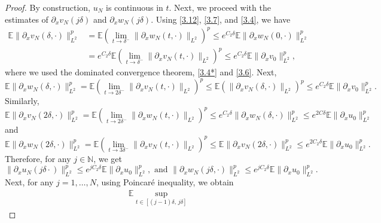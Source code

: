 \documentclass[a4paper,12pt]{article}
\numberwithin{equation}{section}
\begin{document}
\begin{proof}  By construction, $u_N$ is continuous in $t$.
Next, we proceed with the estimates of $\partial_x v_N(j \delta)$ and
$\partial_x w_N(j \delta)$.
Using \eqref{3.12}, \eqref{3.7}, and \eqref{3.4}, we have
\begin{align*}
\mathbb{E} \|\partial_x v_N(\delta, \cdot)\|_{L^2}^p
&= \mathbb{E} \left( \lim_{t \to \delta^-}
      \|\partial_x w_N(t, \cdot)\|_{L^2} \right)^p
\le e^{C_2 \delta} \mathbb{E} \|\partial_x w_N(0, \cdot)\|_{L^2}^p \nonumber \\
&= e^{C_2 \delta} \mathbb{E}
   \left( \lim_{t \to \delta^-}
   \|\partial_x v_N(t, \cdot)\|_{L^2} \right)^p
\le e^{C_2 \delta} \mathbb{E} \|\partial_x v_0\|_{L^2}^p,
\end{align*}
where we used the dominated convergence theorem, \eqref{3.4*} and \eqref{3.6}. Next,
\begin{equation*}
\mathbb{E} \|\partial_x w_N(\delta, \cdot)\|_{L^2}^p
= \mathbb{E} \left( \lim_{t \to 2 \delta^-}
\|\partial_x v_N(t, \cdot)\|_{L^2} \right)^p \le \mathbb{E} \left(
\|\partial_x v_N(\delta, \cdot)\|_{L^2} \right)^p
\le e^{C_2 \delta} \mathbb{E} \|\partial_x v_0\|_{L^2}^p .
\end{equation*}
Similarly,
\begin{equation*}
\mathbb{E} \|\partial_x v_N(2\delta, \cdot)\|_{L^2}^p
 = \mathbb{E} \left( \lim_{t \to 2\delta^-}
\|\partial_x w_N(t, \cdot)\|_{L^2} \right)^p \le e^{C_2\delta}\|\partial_x w_N(\delta, \cdot)\|_{L^2}^p
\le e^{2C\delta} \mathbb{E} \|\partial_x u_0\|_{L^2}^p
\end{equation*}
and
\begin{equation*}
\mathbb{E} \|\partial_x w_N(2\delta, \cdot)\|_{L^2}^p
= \mathbb{E} \left( \lim_{t \to 3\delta^-}
\|\partial_x v_N(t, \cdot)\|_{L^2} \right)^p \le \mathbb{E} 
\|\partial_x v_N(2 \delta, \cdot)\|_{L^2}^p
\le e^{2C_2\delta} \mathbb{E} \|\partial_x u_0\|_{L^2}^p .
\end{equation*}
Therefore, for any $j \in \mathbb{N}$, we get
\begin{equation} \label{3.14}
\|\partial_x u_N(j\delta \cdot)\|_{L^2}^p
\le e^{j C_2 \delta} \mathbb{E} \|\partial_x u_0\|_{L^2}^p,
 {\text{ and }}
\|\partial_x w_N(j\delta, \cdot)\|_{L^2}^p
\le e^{j C_2 \delta} \mathbb{E} \|\partial_x u_0\|_{L^2}^p .
\end{equation}
Next, for any $j = 1,\dots,N$, using Poincar\'e inequality, we obtain
\begin{align}\label{3.15}
\nonumber & \mathbb{E} \sup_{t \in [(j-1)\delta,\, j\delta]}

\end{align}
\end{proof}
\end{document}
